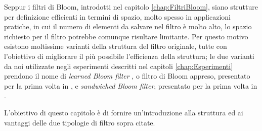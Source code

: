 \documentclass[../../main.tex]{subfiles}
\begin{document}
    Seppur i filtri di Bloom, introdotti nel capitolo \ref{chap:FiltriBloom}, siano strutture per definizione efficienti in termini di spazio, molto spesso in applicazioni pratiche, in cui il numero di elementi da salvare nel filtro è molto alto, lo spazio richiesto per il filtro potrebbe comunque risultare limitante. Per questo motivo esistono moltissime varianti della struttura del filtro originale, tutte con l'obiettivo di migliorare il più possibile l'efficienza della struttura; le due varianti da noi utilizzate negli esperimenti descritti nel capitoli \ref{chap:Esperimenti} prendono il nome di \textit{learned Bloom filter} , o filtro di Bloom appreso, presentato per la prima volta in \cite{kraska2018case}, e \textit{sandwiched Bloom filter}, presentato per la prima volta in \cite{10.5555/3326943.3326986}. 

    L'obiettivo di questo capitolo è di fornire un'introduzione alla struttura ed ai vantaggi delle due tipologie di filtro sopra citate.
\end{document}
